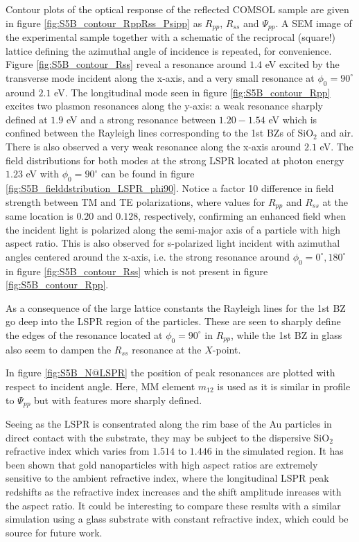 Contour plots of the optical response of the reflected COMSOL sample are given in figure \ref{fig:S5B_contour_RppRss_Psipp} as $R_{pp}$, $R_{ss}$ and $\Psi_{pp}$. A SEM image of the experimental sample together with a schematic of the reciprocal (square!) lattice defining the azimuthal angle of incidence is repeated, for convenience. Figure \ref{fig:S5B_contour_Rss} reveal a resonance around $1.4$ eV excited by the transverse mode incident along the x-axis, and a very small resonance at $\phi_0=90^\circ$ around $2.1$ eV. The longitudinal mode seen in figure \ref{fig:S5B_contour_Rpp} excites two plasmon resonances along the y-axis: a weak resonance sharply defined at $1.9$ eV and a strong resonance between $1.20-1.54$ eV which is confined between the Rayleigh lines corresponding to the 1st BZs of SiO$_2$ and air. There is also observed a very weak resonance along the x-axis around $2.1$ eV. The field distributions for both modes at the strong LSPR located at photon energy $1.23$ eV with $\phi_0=90^\circ$ can be found in figure \ref{fig:S5B_fielddstribution_LSPR_phi90}. Notice a factor 10 difference in field strength between TM and TE polarizations, where values for $R_{pp}$ and $R_{ss}$ at the same location is $0.20$ and $0.128$, respectively, confirming an enhanced field when the incident light is polarized along the semi-major axis of a particle with high aspect ratio. This is also observed for s-polarized light incident with azimuthal angles centered around the x-axis, i.e. the strong resonance around $\phi_0=0^\circ, 180^\circ$ in figure \ref{fig:S5B_contour_Rss} which is not present in figure \ref{fig:S5B_contour_Rpp}.

As a consequence of the large lattice constants the Rayleigh lines for the 1st BZ go deep into the LSPR region of the particles. These are seen to sharply define the edges of the resonance located at $\phi_0=90^\circ$ in $R_{pp}$, while the 1st BZ in glass also seem to dampen the $R_{ss}$ resonance at the $X$-point. 

In figure \ref{fig:S5B_N@LSPR} the position of peak resonances are plotted with respect to incident angle. Here, MM element $m_{12}$ is used as it is similar in profile to $\Psi_{pp}$ but with features more sharply defined.

Seeing as the LSPR is consentrated along the rim base of the Au particles in direct contact with the substrate, they may be subject to the dispersive SiO$_2$ refractive index which varies from $1.514$ to $1.446$ in the simulated region. It has been shown that gold nanoparticles with high aspect ratios are extremely sensitive to the ambient refractive index, where the longitudinal LSPR peak redshifts as the refractive index increases and the shift amplitude inreases with the aspect ratio\cite{LSPR_sensor_review}\cite{Au_nanorods_review}. It could be interesting to compare these results with a similar simulation using a glass substrate with constant refractive index, which could be source for future work.

